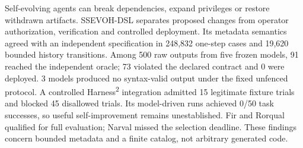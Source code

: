 Self-evolving agents can break dependencies, expand privileges or restore withdrawn artifacts. SSEVOH-DSL separates proposed changes from operator authorization, verification and controlled deployment. Its metadata semantics agreed with an independent specification in 248,832 one-step cases and 19,620 bounded history transitions. Among 500 raw outputs from five frozen models, 91 reached the independent oracle; 73 violated the declared contract and 0 were deployed. 3 models produced no syntax-valid output under the fixed unfenced protocol. A controlled Harness\textsuperscript{2} integration admitted 15 legitimate fixture trials and blocked 45 disallowed trials. Its model-driven runs achieved 0/50 task successes, so useful self-improvement remains unestablished. Fir and Rorqual qualified for full evaluation; Narval missed the selection deadline. These findings concern bounded metadata and a finite catalog, not arbitrary generated code.
